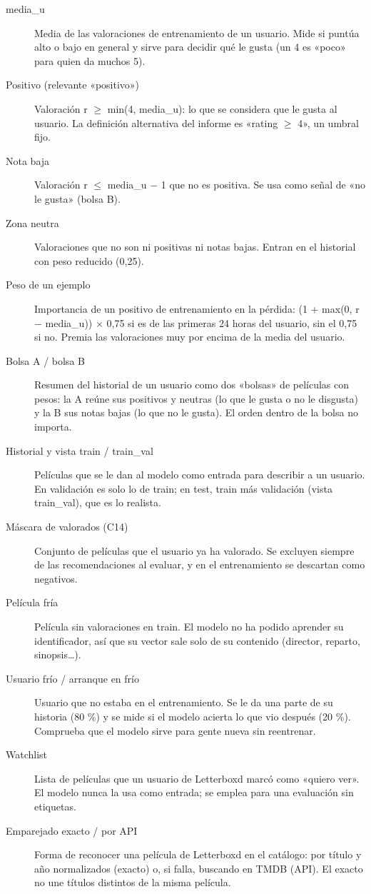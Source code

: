 \begin{description}
\item[media\_u] Media de las valoraciones de entrenamiento de un usuario. Mide si puntúa alto o bajo en general y sirve para decidir qué le gusta (un 4 es «poco» para quien da muchos 5).
\item[Positivo (relevante «positivo»)] Valoración r $\geq$ min(4, media\_u): lo que se considera que le gusta al usuario. La definición alternativa del informe es «rating $\geq$ 4», un umbral fijo.
\item[Nota baja] Valoración r $\leq$ media\_u $-$ 1 que no es positiva. Se usa como señal de «no le gusta» (bolsa B).
\item[Zona neutra] Valoraciones que no son ni positivas ni notas bajas. Entran en el historial con peso reducido (0,25).
\item[Peso de un ejemplo] Importancia de un positivo de entrenamiento en la pérdida: (1 + max(0, r $-$ media\_u)) $\times$ 0,75 si es de las primeras 24 horas del usuario, sin el 0,75 si no. Premia las valoraciones muy por encima de la media del usuario.
\item[Bolsa A /\allowbreak{} bolsa B] Resumen del historial de un usuario como dos «bolsas» de películas con pesos: la A reúne sus positivos y neutras (lo que le gusta o no le disgusta) y la B sus notas bajas (lo que no le gusta). El orden dentro de la bolsa no importa.
\item[Historial y vista train /\allowbreak{} train\_val] Películas que se le dan al modelo como entrada para describir a un usuario. En validación es solo lo de train; en test, train más validación (vista train\_val), que es lo realista.
\item[Máscara de valorados (C14)] Conjunto de películas que el usuario ya ha valorado. Se excluyen siempre de las recomendaciones al evaluar, y en el entrenamiento se descartan como negativos.
\item[Película fría] Película sin valoraciones en train. El modelo no ha podido aprender su identificador, así que su vector sale solo de su contenido (director, reparto, sinopsis…).
\item[Usuario frío /\allowbreak{} arranque en frío] Usuario que no estaba en el entrenamiento. Se le da una parte de su historia (80 \%) y se mide si el modelo acierta lo que vio después (20 \%). Comprueba que el modelo sirve para gente nueva sin reentrenar.
\item[Watchlist] Lista de películas que un usuario de Letterboxd marcó como «quiero ver». El modelo nunca la usa como entrada; se emplea para una evaluación sin etiquetas.
\item[Emparejado exacto /\allowbreak{} por API] Forma de reconocer una película de Letterboxd en el catálogo: por título y año normalizados (exacto) o, si falla, buscando en TMDB (API). El exacto no une títulos distintos de la misma película.
\end{description}

